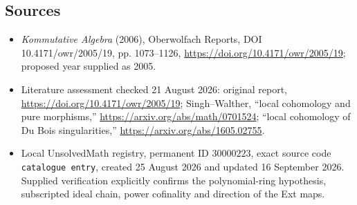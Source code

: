 \documentclass[11pt]{article}
\begin{document}
\subsection{Sources}
\begin{itemize}
\item \emph{Kommutative Algebra} (2006), Oberwolfach Reports, DOI 10.4171/owr/2005/19, pp. 1073--1126, \url{https://doi.org/10.4171/owr/2005/19}; proposed year supplied as 2005.
\item Literature assessment checked 21 August 2026: original report, \url{https://doi.org/10.4171/owr/2005/19}; Singh--Walther, ``local cohomology and pure morphisms,'' \url{https://arxiv.org/abs/math/0701524}; ``local cohomology of Du Bois singularities,'' \url{https://arxiv.org/abs/1605.02755}.
\item Local UnsolvedMath registry, permanent ID $30000223$, exact source code \texttt{catalogue entry}, created 25 August 2026 and updated 16 September 2026. Supplied verification explicitly confirms the polynomial-ring hypothesis, subscripted ideal chain, power cofinality and direction of the Ext maps.
\end{itemize}
\end{document}
